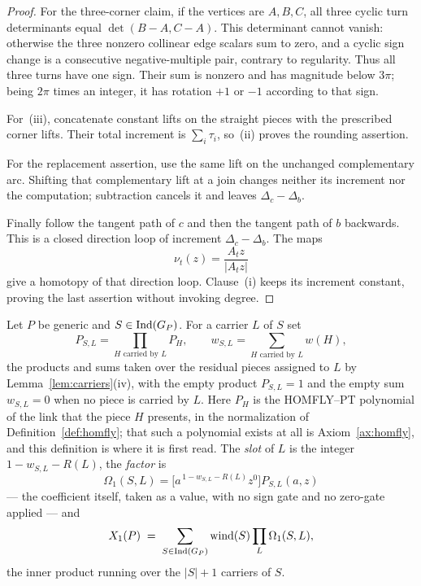 \begin{proof}
For the three-corner claim, if the vertices are $A,B,C$, all three cyclic turn
determinants equal $\det(B-A,C-A)$. This determinant cannot vanish: otherwise
the three nonzero collinear edge scalars sum to zero, and a cyclic sign change
is a consecutive negative-multiple pair, contrary to regularity. Thus all
three turns have one sign. Their sum is nonzero and has magnitude below
$3\pi$; being $2\pi$ times an integer, it has rotation $+1$ or $-1$ according
to that sign.

For~(iii), concatenate constant lifts on the straight pieces with the
prescribed corner lifts. Their total increment is $\sum_i\tau_i$, so~(ii)
proves the rounding assertion.

For the replacement assertion, use the same lift on the unchanged
complementary arc. Shifting that complementary lift at a join changes neither
its increment nor the computation; subtraction cancels it and leaves
$\Delta_c-\Delta_b$.

Finally follow the tangent path of $c$ and then the tangent path of $b$
backwards. This is a closed direction loop of increment
$\Delta_c-\Delta_b$. The maps
\[
   \nu_t(z)=\frac{A_tz}{|A_tz|}
\]
give a homotopy of that direction loop. Clause~(i) keeps its increment
constant, proving the last assertion without invoking degree.
\end{proof}

\begin{definition}\label{def:X1}
Let $P$ be generic and $S\in\operatorname{Ind}(G_P)$. For a carrier $L$ of $S$ set
\[
  P_{S,L}=\prod_{H\text{ carried by }L}P_H,\qquad
  w_{S,L}=\sum_{H\text{ carried by }L}w(H),
\]
the products and sums taken over the residual pieces assigned to $L$ by
Lemma~\ref{lem:carriers}(iv), with the empty product $P_{S,L}=1$ and the empty
sum $w_{S,L}=0$ when no piece is carried by $L$. Here $P_H$ is the HOMFLY--PT
polynomial of the link that the piece $H$ presents, in the normalization of
Definition~\ref{def:homfly}; that such a polynomial exists at all is
Axiom~\ref{ax:homfly}, and this definition is where it is first read. The \emph{slot} of $L$ is the
integer $1-w_{S,L}-R(L)$, the \emph{factor} is
\[
   \Omega_1(S,L)=\bigl[a^{\,1-w_{S,L}-R(L)}z^{0}\bigr]P_{S,L}(a,z)
\]
--- the coefficient itself, taken as a value, with no sign gate and no
zero-gate applied --- and
\[
   X_1(P)\;=\;\sum_{S\in\operatorname{Ind}(G_P)}\operatorname{wind}(S)\prod_{L}\Omega_1(S,L),
\]
the inner product running over the $|S|+1$ carriers of $S$.
\end{definition}

